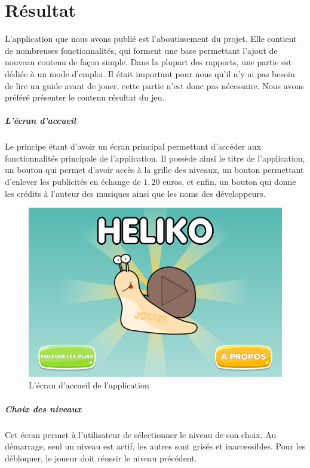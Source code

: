 \chapter{Résultat}

L'application que nous avons publié est l'aboutissement du projet. Elle contient de nombreuses fonctionnalités, qui forment une base permettant l'ajout de nouveau contenu de façon simple. Dans la plupart des rapports, une partie est dédiée à un mode d'emploi. Il était important pour nous qu'il n'y ai pas besoin de lire un guide avant de jouer, cette partie n'est donc pas nécessaire. Nous avons préféré présenter le contenu résultat du jeu.

\paragraph{L'écran d'accueil} Le principe étant d'avoir un écran principal permettant d'accéder aux fonctionnalités principale de l'application. Il possède ainsi le titre de l'application, un bouton qui permet d'avoir accès à la grille des niveaux, un bouton permettant d'enlever les publicités en échange de $1,20$ euros, et enfin, un bouton qui donne les crédits à l'auteur des musiques ainsi que les noms des développeurs.

\begin{figure}[H]\centering
  \includegraphics[scale=0.6]{./img/resultat_accueil.png}
  \caption{L'écran d'accueil de l'application}
  \label{analytics}
\end{figure}

\paragraph{Choix des niveaux} Cet écran permet à l'utilisateur de sélectionner le niveau de son choix. Au démarrage, seul un niveau est actif, les autres sont grisés et inaccessibles. Pour les débloquer, le joueur doit réussir le niveau précédent.

